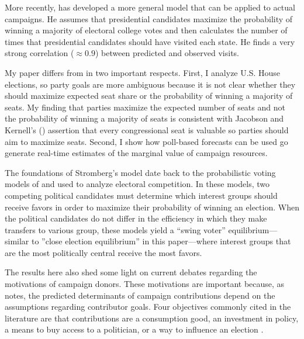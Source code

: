 \documentclass[12pt,final,fleqn]{article}
\theoremstyle{plain}
\begin{document}
More recently, \citet{stromberg2008electoral} has developed a more general model that can be applied to actual campaigns. He assumes that presidential candidates maximize the probability of winning a majority of electoral college votes and then calculates the number of times that presidential candidates should have visited each state. He finds a very strong  correlation ($ \approx 0.9$) between predicted and observed visits. 

My paper differs from \citet*{stromberg2008electoral} in two important respects. First, I analyze U.S. House elections, so party goals are more ambiguous because it is not clear whether they should maximize expected seat share or the probability of winning a majority of seats.  My finding that parties maximize the expected number of seats and not the probability of winning a majority of seats is consistent with Jacobson and Kernell's (\citeyear{jacobson1985party}) assertion that every congressional seat is valuable so parties should aim to maximize seats. Second, I show how poll-based forecasts can be used go generate real-time estimates of the marginal value of campaign resources.

The foundations of Stromberg's model date back to the probabilistic voting models of \citet{lindbeck1987balanced} and \citet{dixit1996determinants} used to analyze electoral competition. In these models, two competing political candidates must determine which interest groups should receive favors in order to maximize their probability of winning an election. When the political candidates do not differ in the efficiency in which they make transfers to various group, these models yield a ``swing voter'' equilibrium---similar to ''close election equilibrium'' in this paper---where interest groups that are the most politically central receive the most favors.

The results here also shed some light on current debates regarding the motivations of campaign donors. These motivations are important because, as \citet{stratmann2005some} notes, the predicted determinants of campaign contributions depend on the assumptions regarding contributor goals. Four objectives commonly cited in the literature are that contributions are a consumption good, an investment in policy, a means to buy access to a politician, or a way to influence an election \citep[e.g.][]{ansolabehere2003there, stratmann2005some}. 
\end{document}
